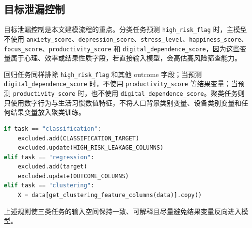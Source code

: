 \subsection{目标泄漏控制}

目标泄漏控制是本文建模流程的重点。分类任务预测 \texttt{high\_risk\_flag} 时，主模型不使用 \texttt{anxiety\_score}、\texttt{depression\_score}、\texttt{stress\_level}、\texttt{happiness\_score}、\texttt{focus\_score}、\texttt{productivity\_score} 和 \texttt{digital\_dependence\_score}，因为这些变量属于心理、效率或结果性质字段，若直接输入模型，会高估高风险筛查能力。

回归任务同样排除 \texttt{high\_risk\_flag} 和其他 outcome 字段；当预测 \texttt{digital\_dependence\_score} 时，不使用 \texttt{productivity\_score} 等结果变量；当预测 \texttt{productivity\_score} 时，也不使用 \texttt{digital\_dependence\_score}。聚类任务则只使用数字行为与生活习惯数值特征，不将人口背景类别变量、设备类别变量和任何结果变量放入聚类训练。

\begin{lstlisting}[language=Python,caption={任务级特征排除逻辑示例}]
if task == "classification":
    excluded.add(CLASSIFICATION_TARGET)
    excluded.update(HIGH_RISK_LEAKAGE_COLUMNS)
elif task == "regression":
    excluded.add(target)
    excluded.update(OUTCOME_COLUMNS)
elif task == "clustering":
    X = data[get_clustering_feature_columns(data)].copy()
\end{lstlisting}

上述规则使三类任务的输入空间保持一致、可解释且尽量避免结果变量反向进入模型。
